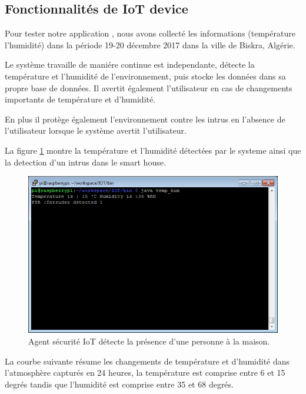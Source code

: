 \subsection{Fonctionnalités  de IoT device }
Pour tester notre application , nous avons collecté les informations (température l'humidité) dans la période 19-20 décembre 2017 dans la ville de Biskra, Algérie.

Le système travaille de maniére continue est independante,  détecte la température et l'humidité de l'environnement, puis stocke les données dans sa propre base de données. Il avertit également l'utilisateur en cas de changements importants de température et d'humidité. 

En plus il protège également l'environnement contre les intrus en l'absence de l'utilisateur lorsque le système avertit l'utilisateur.

La figure \ref{fc27} montre la température et l'humidité détectées par le systeme ainsi que la detection d'un intrus dans le smart house.
\begin{figure}[H]
    \centering
    \includegraphics[scale=0.8]{chap1/fc27.png}
    \caption{Agent sécurité IoT détecte la présence d'une personne à la maison.}
    \label{fc27}
\end{figure}

La courbe suivante résume les changements de température et d'humidité dans l'atmosphère capturés en 24 heures, la température est comprise entre 6 et 15 degrés tandis que l'humidité est comprise entre 35 et 68 degrés.

